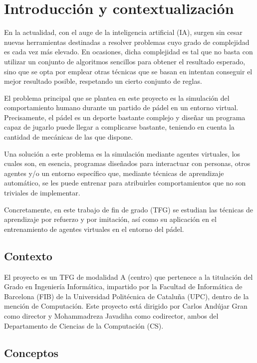 \chapter{Introducción y contextualización}\label{chapter:introduccion}

En la actualidad, con el auge de la inteligencia artificial (IA), surgen sin cesar nuevas herramientas destinadas a resolver problemas cuyo grado de complejidad es cada vez más elevado. En ocasiones, dicha complejidad es tal que no basta con utilizar un conjunto de algoritmos sencillos para obtener el resultado esperado, sino que se opta por emplear otras técnicas  que se basan en intentan conseguir el mejor resultado posible, respetando un cierto conjunto de reglas.

El problema principal que se plantea en este proyecto es la simulación del comportamiento humano durante un partido de pádel en un entorno virtual. Precisamente, el pádel es un deporte bastante complejo y diseñar un programa capaz de jugarlo puede llegar a complicarse bastante, teniendo en cuenta la cantidad de mecánicas de las que dispone.

Una solución a este problema es la simulación mediante agentes virtuales, los cuales son, en esencia, programas diseñados para interactuar con personas, otros agentes y/o un entorno específico que, mediante técnicas de aprendizaje automático, se les puede entrenar para atribuirles comportamientos que no son triviales de implementar.

Concretamente, en este trabajo de fin de grado (TFG) se estudian las técnicas de aprendizaje por refuerzo y por imitación, así como su aplicación en el entrenamiento de agentes virtuales en el entorno del pádel. 

\section{Contexto}

El proyecto \emph{\getTitulo} es un TFG de modalidad A (centro) que pertenece a la titulación del Grado en Ingeniería Informática, impartido por la Facultad de Informática de Barcelona (FIB) de la Universidad Politécnica de Cataluña (UPC), dentro de la mención de Computación. Este proyecto está dirigido por Carlos Andújar Gran como director y Mohammadreza Javadiha como codirector, ambos del Departamento de Ciencias de la Computación (CS).

\section{Conceptos}\label{section:conceptos}

